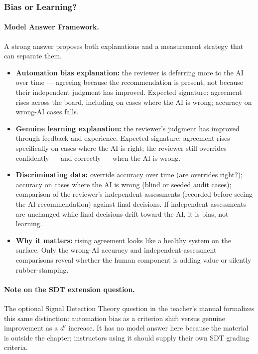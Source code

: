 \subsubsection{Bias or Learning?}

\paragraph{Model Answer Framework.}

A strong answer proposes both explanations and a measurement strategy that can separate them.

\begin{itemize}
    \item \textbf{Automation bias explanation:} the reviewer is deferring more to the AI over time --- agreeing because the recommendation is present, not because their independent judgment has improved. Expected signature: agreement rises across the board, including on cases where the AI is wrong; accuracy on wrong-AI cases falls.
    \item \textbf{Genuine learning explanation:} the reviewer's judgment has improved through feedback and experience. Expected signature: agreement rises specifically on cases where the AI is right; the reviewer still overrides confidently --- and correctly --- when the AI is wrong.
    \item \textbf{Discriminating data:} override accuracy over time (are overrides right?); accuracy on cases where the AI is wrong (blind or seeded audit cases); comparison of the reviewer's independent assessments (recorded before seeing the AI recommendation) against final decisions. If independent assessments are unchanged while final decisions drift toward the AI, it is bias, not learning.
    \item \textbf{Why it matters:} rising agreement looks like a healthy system on the surface. Only the wrong-AI accuracy and independent-assessment comparisons reveal whether the human component is adding value or silently rubber-stamping.
\end{itemize}

\paragraph{Note on the SDT extension question.}
The optional Signal Detection Theory question in the teacher's manual formalizes this same distinction: automation bias as a criterion shift versus genuine improvement as a $d'$ increase. It has no model answer here because the material is outside the chapter; instructors using it should supply their own SDT grading criteria.

